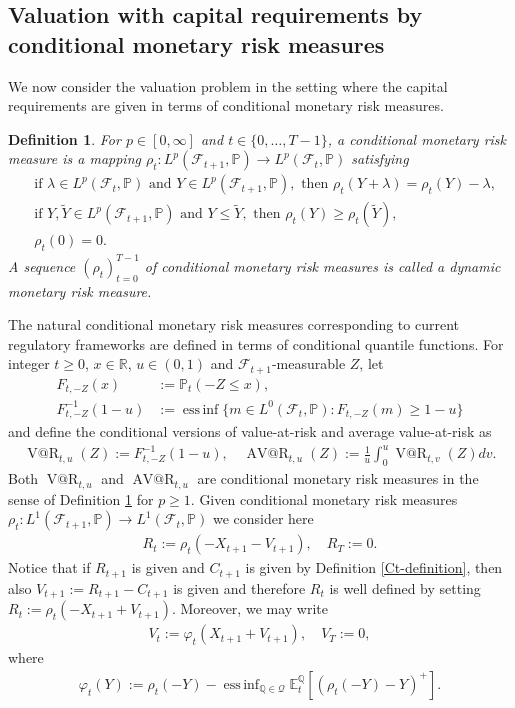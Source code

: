 \documentclass[11pt,a4paper]{article}
\makeatletter
\newtheorem{definition}{Definition}
\newcommand{\E}{\mathbb{E}}
\newcommand{\VaR}{\operatorname{V@R}}
\newcommand{\AVaR}{\operatorname{AV@R}}
\DeclareMathOperator*{\essinf}{ess\,inf}
\renewcommand{\P}{\mathbb{P}}
\newcommand{\Q}{\mathbb{Q}}
\newcommand{\R}{\mathbb{R}}
\renewcommand{\phi}{\varphi}
\newcommand{\calF}{\mathcal{F}}
\newcommand{\calQ}{\mathcal{Q}}
\makeatother
\begin{document}
\subsection{Valuation with capital requirements by conditional monetary risk measures}\label{sec:cmrmcr}

We now consider the valuation problem in the setting where the capital requirements are given in terms of 
conditional monetary risk measures.

\begin{definition}\label{def:dynrisk}
For $p\in [0,\infty]$ and $t\in\{0,\dots,T-1\}$, a conditional monetary risk measure is a mapping $\rho_t:L^p(\calF_{t+1},\P)\to L^p(\calF_t,\P)$ satisfying
\begin{align}
& \textrm{if } \lambda\in L^p(\calF_t,\P) \textrm{ and } Y\in L^p(\calF_{t+1},\P), \textrm{ then } 
\rho_t(Y+\lambda)=\rho_t(Y)-\lambda,  \label{eq:ci_r}\\
& \textrm{if } Y,\widetilde{Y}\in L^p(\calF_{t+1},\P) \textrm{ and } Y\leq \widetilde{Y}, \textrm{ then } 
\rho_t(Y)\geq \rho_t(\widetilde{Y}),  \label{eq:mo_r}\\
& \rho_t(0)=0. \label{eq:no_r}
\end{align}
A sequence $(\rho_t)_{t=0}^{T-1}$ of conditional monetary risk measures is called a dynamic monetary risk measure.
\end{definition}

The natural conditional monetary risk measures corresponding to current regulatory frameworks are defined in terms of conditional quantile functions. For integer $t\geq 0$, $x\in\R$, $u\in (0,1)$ and $\calF_{t+1}$-measurable $Z$, let 
\begin{align*}
F_{t,-Z}(x)&:=\P_t(-Z\leq x),\\
F_{t,-Z}^{-1}(1-u)&:=\essinf\{m\in L^0(\calF_t,\P):F_{t,-Z}(m)\geq 1-u\}
\end{align*}
and define the conditional versions of value-at-risk and average value-at-risk as 
\begin{align*}
\VaR_{t,u}(Z):=F_{t,-Z}^{-1}(1-u), \quad \AVaR_{t,u}(Z):=\frac{1}{u}\int_0^u\VaR_{t,v}(Z)dv.
\end{align*}
Both $\VaR_{t,u}$ and $\AVaR_{t,u}$ are conditional monetary risk measures in the sense of Definition \ref{def:dynrisk} for $p\geq 1$. 
Given conditional monetary risk measures $\rho_t:L^1(\calF_{t+1},\P)\to L^1(\calF_t,\P)$ we consider here 
\begin{align}\label{eq:Rtbyrhot}
R_t := \rho_t(-X_{t+1}-V_{t+1}), \quad R_T:=0.
\end{align}
Notice that if $R_{t+1}$ is given and $C_{t+1}$ is given by Definition \ref{Ct-definition}, then also $V_{t+1}:=R_{t+1}-C_{t+1}$ is given and therefore $R_t$ is well defined by setting $R_t := \rho_t(-X_{t+1}+V_{t+1})$. Moreover, we may write 
\begin{align}\label{eq:Vtbyrhot}
V_t := \phi_t(X_{t+1}+V_{t+1}), \quad V_T:=0,
\end{align}
where 
\begin{align*}
\phi_t(Y) := \rho_t(-Y)-\essinf_{\Q \in \calQ} \E_t^{\Q}[(\rho_t(-Y)-Y)^+].
\end{align*}
\end{document}
